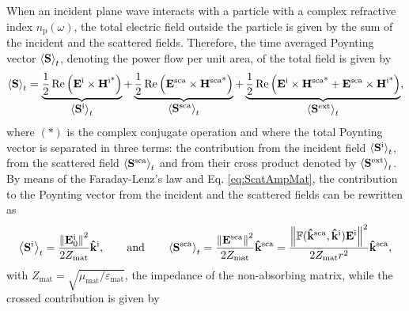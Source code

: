 When an incident plane wave interacts with a particle with a complex refractive index $n_\text{p}(\omega)$, the total electric field outside the particle is given by the sum of the incident and the scattered fields. Therefore, the time averaged Poynting vector $\ev{\vb{S}}_t$, denoting the power flow per unit area, of the total field is given by
%
\begin{align}
	\ev{\vb{S}}_t
		= \underbrace{\frac12 \Re \qty(\vb{E}^\text{i}\times\vb{H}^\text{i*})}_{\text{\normalsize $\ev{\vb{S}^\text{i}}_t $}} +
		  \underbrace{\frac12 \Re \qty(\vb{E}^\text{sca}\times\vb{H}^\text{sca*})}_{\text{\normalsize $\ev{\vb{S}^\text{sca}}_t $}}+
		   \underbrace{	\frac12 \Re\qty(\vb{E}^\text{i}\times\vb{H}^\text{sca*} + \vb{E}^\text{sca}\times\vb{H}^\text{i*})}_{\text{\normalsize$\ev{\vb{S}^\text{ext}}_t$}},
 \label{eq:Stot}
\end{align}
%
where $(*)$ is the complex conjugate operation and where the total Poynting vector is separated in three terms: the contribution from the incident field $\ev{\vb{S}^\text{i}}_t$, from the scattered field $\ev{\vb{S}^\text{sca}}_t$ and from their cross product denoted by $\ev{\vb{S}^\text{ext}}_t$. By means of the Faraday-Lenz's law and Eq. \eqref{eq:ScatAmpMat}, the  contribution to the Poynting vector from the incident and the scattered fields can be rewritten as
%
%
\begin{equation}
	\ev{\vb{S}^\text{i}}_t = \frac{\norm{\vb{E}_0^\text{i}}^2}{2 Z_\text{mat}}\vu{k}^\text{i},
		\qquad\text{and}\qquad
	\ev{\vb{S}^\text{sca}}_t = \frac{\norm{\vb{E}^\text{sca}}^2}{2 Z_\text{mat}}\vu{k}^\text{sca}
						=  \frac{\norm{\mathbb{F}(\vu{k}^\text{sca},\vu{k}^\text{i})\vb{E}^\text{i}}^2}{2 Z_\text{mat}r^2}\vu{k}^\text{sca},
 \label{eq:AvePoyntingISca}
\end{equation}
%
with $Z_\text{mat} = \sqrt{\mu_\text{mat}/\varepsilon_\text{mat}}$, the impedance of the non-absorbing matrix, while the crossed contribution is given by
